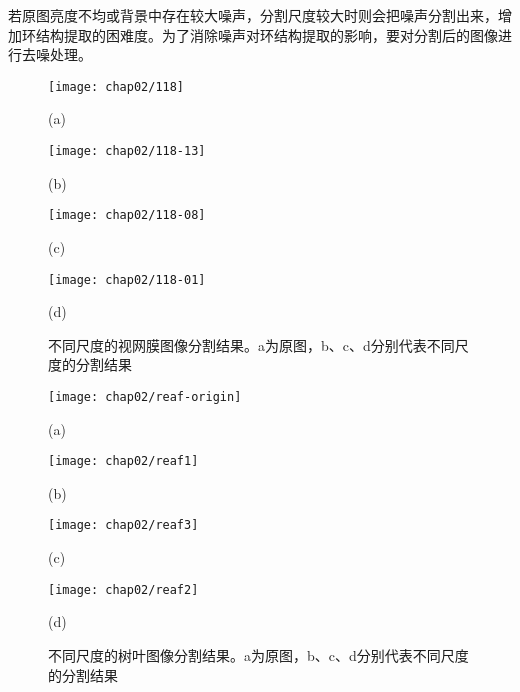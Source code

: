 若原图亮度不均或背景中存在较大噪声，分割尺度较大时则会把噪声分割出来，增加环结构提取的困难度。为了消除噪声对环结构提取的影响，要对分割后的图像进行去噪处理。

\begin{figure}[H]
\centering
  \begin{minipage}[b]{0.48\textwidth} 
      \centering 
      \texttt{[image: chap02/118]}
        \centerline{(a)}\medskip
    \end{minipage}
  \begin{minipage}[b]{0.48\textwidth}
    \centering
    \texttt{[image: chap02/118-13]}
      \centerline{(b)}\medskip
  \end{minipage}
  \begin{minipage}[b]{0.48\textwidth}
    \centering
    \texttt{[image: chap02/118-08]}
      \centerline{(c)}\medskip
  \end{minipage}
  \begin{minipage}[b]{0.48\textwidth}
    \centering
    \texttt{[image: chap02/118-01]}
      \centerline{(d)}\medskip
	\label{fig:max}
  \end{minipage}
\caption{不同尺度的视网膜图像分割结果。a为原图，b、c、d分别代表不同尺度的分割结果}
\label{fig:Segmentaion-retinal}
\end{figure}

\begin{figure}[H]
\centering
  \begin{minipage}[b]{0.48\textwidth} 
      \centering 
      \texttt{[image: chap02/reaf-origin]}
        \centerline{(a)}\medskip
    \end{minipage}
  \begin{minipage}[b]{0.48\textwidth}
    \centering
    \texttt{[image: chap02/reaf1]}
      \centerline{(b)}\medskip
  \end{minipage}
  \begin{minipage}[b]{0.48\textwidth}
    \centering
    \texttt{[image: chap02/reaf3]}
      \centerline{(c)}\medskip
  \end{minipage}
  \begin{minipage}[b]{0.48\textwidth}
    \centering
    \texttt{[image: chap02/reaf2]}
      \centerline{(d)}\medskip
	\label{fig:max}
  \end{minipage}
\caption{不同尺度的树叶图像分割结果。a为原图，b、c、d分别代表不同尺度的分割结果}
\label{fig:Segmentaion-retinal1}
\end{figure}

